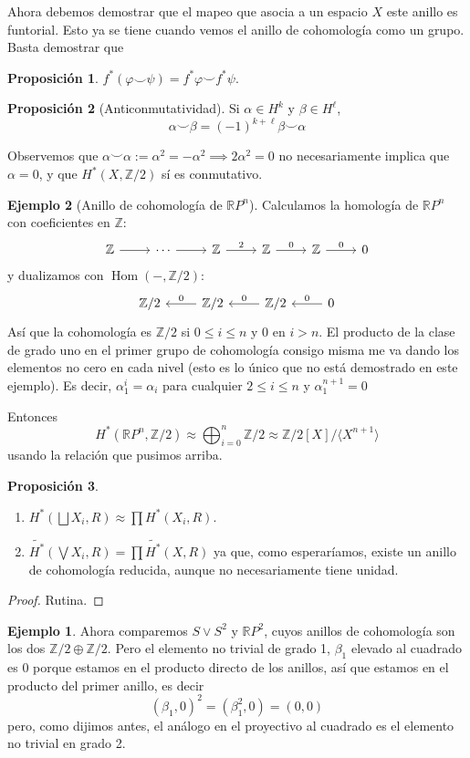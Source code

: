 \documentclass[spanish]{book}
\theoremstyle{definition}
\newtheorem*{prop}{Proposición}
\newtheorem*{ejem}{Ejemplo}
\newcommand{\R}{\mathbb{R}}
\newcommand{\Z}{\mathbb{Z}}
\DeclareMathOperator{\Hom}{Hom}
\begin{document}
Ahora debemos demostrar que el mapeo que asocia a un espacio $X$ este anillo es funtorial. Esto ya se tiene cuando vemos el anillo de cohomología como un grupo. Basta demostrar que
\begin{prop}
	$f^*(\varphi\smile\psi)=f^*\varphi\smile f^*\psi$.
\end{prop}
\begin{prop}[Anticonmutatividad]
	Si $\alpha\in H^k$ y $\beta\in H^\ell$,
	\[\alpha\smile\beta=(-1)^{k+\ell}\beta\smile\alpha\]
\end{prop}
Observemos que $\alpha\smile\alpha:=\alpha^2=-\alpha^2\implies2\alpha^2=0$ no necesariamente implica que $\alpha=0$, y que $H^*(X,\Z/2)$ sí es conmutativo.
\begin{ejem}[Anillo de cohomología de $\R P^n$]
	Calculamos la homología de $\R P^n$ con coeficientes en $\Z$:
	\[\begin{tikzcd}
		\Z\arrow[r]&\cdots\arrow[r]&\Z\arrow[r,"2"]&\Z\arrow[r,"0"]&\Z\arrow[r,"0"]&0
	\end{tikzcd}\]
	y dualizamos con $\Hom(-,\Z/2)$:
	\[\begin{tikzcd}
		\Z/2&\Z/2\arrow[l,swap,"0"]&\Z/2\arrow[l,swap,"0"]&0\arrow[l,swap,"0"]
	\end{tikzcd}\]
	Así que la cohomología es $\Z/2$ si $0\leq i\leq n$ y $0$ en $i>n$. El producto de la clase de grado uno en el primer grupo de cohomología consigo misma me va dando los elementos no cero en cada nivel (esto es lo único que no está demostrado en este ejemplo). Es decir, $\alpha_1^i=\alpha_i$ para cualquier $2\leq i\leq n$ y $\alpha^{n+1}_1=0$
	
	 Entonces
	\[H^*(\R P^n,\Z/2)\approx\bigoplus_{i=0}^n\Z/2\approx\Z/2[X]/\langle X^{n+1}\rangle\]
	usando la relación que pusimos arriba.
	
	\begin{prop}\leavevmode
		\begin{enumerate}
			\item $H^*(\bigsqcup X_i,R)\approx\prod H^*(X_i,R)$.
			\item $\widetilde{H^*}(\bigvee X_i,R)=\prod \widetilde{H^*}(X,R)$ ya que, como esperaríamos, existe un anillo de cohomología reducida, aunque no necesariamente tiene unidad.
		\end{enumerate}
	\end{prop}
	\begin{proof}
		Rutina.
	\end{proof}
	\begin{ejem}
		Ahora comparemos $S\vee S^2$ y $\R P^2$, cuyos anillos de cohomología son los dos $\Z/2\oplus\Z/2$. Pero el elemento no trivial de grado 1, $\beta_1$ elevado al cuadrado es 0 porque estamos en el producto directo de los anillos, así que estamos en el producto del primer anillo, es decir
		\[(\beta_1,0)^2=(\beta_1^2,0)=(0,0)\]
		pero, como dijimos antes, el análogo en el proyectivo al cuadrado es el elemento no trivial en grado 2.
	\end{ejem}
\end{ejem}
\end{document}
